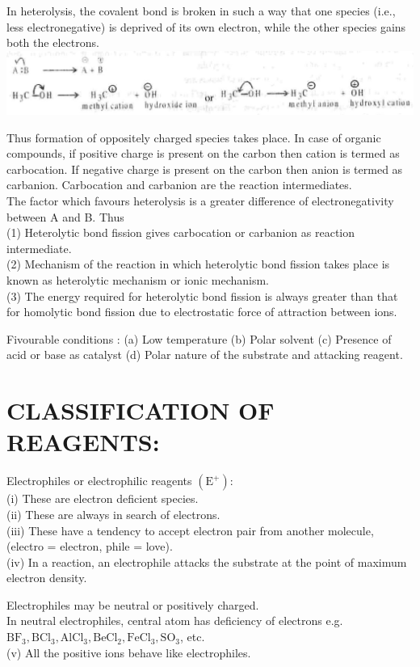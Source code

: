 \documentclass[10pt]{article}
\begin{document}
In heterolysis, the covalent bond is broken in such a way that one species (i.e., less electronegative) is deprived of its own electron, while the other species gains both the electrons.\\
\includegraphics[max width=\textwidth, center]{2025_01_28_8470952b98110cec3aabg-065}

Thus formation of oppositely charged species takes place. In case of organic compounds, if positive charge is present on the carbon then cation is termed as carbocation. If negative charge is present on the carbon then anion is termed as carbanion. Carbocation and carbanion are the reaction intermediates.\\
The factor which favours heterolysis is a greater difference of electronegativity between A and B. Thus\\
(1) Heterolytic bond fission gives carbocation or carbanion as reaction intermediate.\\
(2) Mechanism of the reaction in which heterolytic bond fission takes place is known as heterolytic mechanism or ionic mechanism.\\
(3) The energy required for heterolytic bond fission is always greater than that for homolytic bond fission due to electrostatic force of attraction between ions.

Fivourable conditions : (a) Low temperature (b) Polar solvent (c) Presence of acid or base as catalyst (d) Polar nature of the substrate and attacking reagent.

\section*{CLASSIFICATION OF REAGENTS:}
Electrophiles or electrophilic reagents $\left(\mathrm{E}^{+}\right)$:\\
(i) These are electron deficient species.\\
(ii) These are always in search of electrons.\\
(iii) These have a tendency to accept electron pair from another molecule, (electro = electron, phile = love).\\
(iv) In a reaction, an electrophile attacks the substrate at the point of maximum electron density.

Electrophiles may be neutral or positively charged.\\
In neutral electrophiles, central atom has deficiency of electrons e.g. $\mathrm{BF}_{3}, \mathrm{BCl}_{3}, \mathrm{AlCl}_{3}, \mathrm{BeCl}_{2}, \mathrm{FeCl}_{3}, \mathrm{SO}_{3}$, etc.\\
(v) All the positive ions behave like electrophiles.
\end{document}
